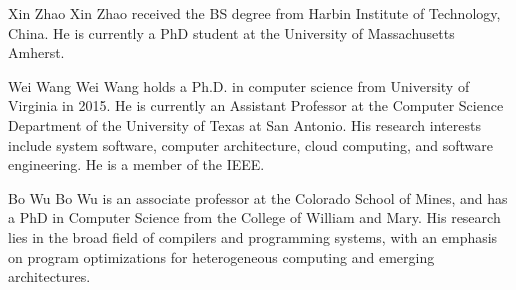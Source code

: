 \documentclass[10pt,journal,compsoc]{IEEEtran}
\begin{document}
\begin{IEEEbiography}{Xin Zhao}
Xin Zhao received the BS degree from Harbin Institute of Technology, China. He is currently a PhD student at the University of Massachusetts Amherst.
\end{IEEEbiography}

\begin{IEEEbiography}{Wei Wang}
Wei  Wang holds  a  Ph.D.  in  computer  science from  University  of  Virginia  in  2015.  He  is  currently  an  Assistant  Professor  at  the  Computer Science Department of the University of Texas at  San  Antonio.  His  research  interests  include system software, computer architecture, cloud computing, and software  engineering. He is a member of the IEEE.
\end{IEEEbiography}


\begin{IEEEbiography}{Bo Wu}
Bo Wu is an associate professor at the Colorado School of Mines, and has a PhD in Computer Science from the College of William and Mary. His research lies in the broad field of compilers and programming systems, with an emphasis on program optimizations for heterogeneous computing and emerging architectures. 
\end{IEEEbiography}
\end{document}
